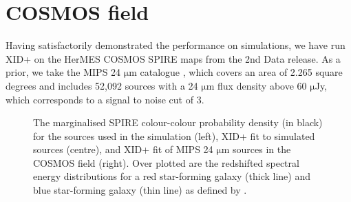 \documentclass[useAMS,usenatbib]{mnras}
\begin{document}
\section{COSMOS field}\label{sec:COSMOS}
Having satisfactorily demonstrated the performance on simulations, we have run \textsc{XID+} on the HerMES COSMOS SPIRE maps from the 2nd Data release. As a prior, we take the MIPS 24 $\mathrm{\mu m}$ catalogue \citep{LeFLoch:2009}, which covers an area of 2.265 square degrees and includes 52,092 sources with a 24 $\mathrm{\mu m}$ flux density above 60 $\mathrm{\mu}$Jy, which corresponds to a signal to noise cut of 3.

\begin{figure}
\centering 
{}
\caption{The marginalised SPIRE colour-colour probability density (in black) for the sources used in the simulation (left), \textsc{XID+} fit to simulated sources (centre), and \textsc{XID+} fit of MIPS 24 $\mathrm{\mu m}$ sources in the COSMOS field (right). Over plotted are the redshifted spectral energy distributions for a red star-forming galaxy (thick line) and blue star-forming galaxy (thin line) as defined by \protect\citep{Berta:2013}.}\label{fig:col-col}
\end{figure}
\end{document}
